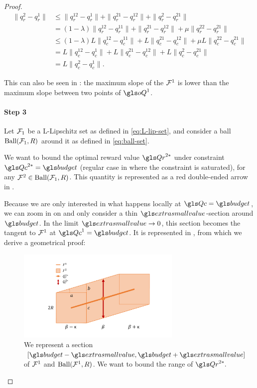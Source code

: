 \begin{proof}
    \begin{align*}
        \|q^2_r-q^{1}_r\| &\leq \|q^{12}_r-q^{1}_r\| + \|q^{21}_r-q^{12}_r\| + \|q^{2}_r-q^{21}_r\| \\
        &= (1-\lambda)\|q^{12}_r-q^{11}_r\| + \|q^{21}_r-q^{12}_r\| + \mu\|q^{22}_r-q^{21}_r\| \\
        &\leq (1-\lambda)L\|q^{12}_c-q^{11}_c\| + L\|q^{21}_c-q^{12}_c\| + \mu L\|q^{22}_c-q^{21}_c\| \\
        &= L\|q^{12}_c-q^{1}_c\| + L\|q^{21}_c-q^{12}_c\| + L\|q^{2}_c-q^{21}_c\|\\
        &= L\|q^{2}_c-q^{1}_c\|.
    \end{align*}

    This can also be seen in : the maximum slope of the $\mathcal{F}^1$ is lower than the maximum slope between two points of $\oQ^1$.

    \paragraph{Step 3}

    Let $\mathcal{F}_1$ be a L-Lipschitz set as defined in \eqref{eq:L-lip-set}, and consider a ball $\text{Ball}(\mathcal{F}_1,R)$ around it as defined in \eqref{eq:ball-set}.

    We want to bound the optimal reward value $\Qr^{2*}$ under constraint $\Qc^{2*} = \budget$ (regular case in  where the constraint is saturated), for any $\mathcal{F}^2\in\text{Ball}(\mathcal{F}_1,R)$. This quantity is represented as a red double-ended arrow in .

    Because we are only interested in what happens locally at $\Qc=\budget$, we can zoom in on  and only consider a thin $\extrasmallvalue$-section around $\budget$. In the limit $\extrasmallvalue\rightarrow 0$, this section becomes the tangent to $\mathcal{F}^1$ at $\Qc^1=\budget$. It is represented in , from which we derive a geometrical proof:

    \begin{figure}[ht]
        \centering
        \includegraphics[trim=2cm 1cm 2cm 1cm, clip, width=0.7\textwidth]{sources/appendix/source/img/ball.pdf}
        \caption{We represent a section $[\budget-\extrasmallvalue, \budget+\extrasmallvalue]$ of $\mathcal{F}^1$ and $\text{Ball}(\mathcal{F}^1, R)$. We want to bound the range of $\Qr^{2*}.$}
        \label{fig:contraction_lips_hull_slope}
    \end{figure}


\end{proof}
